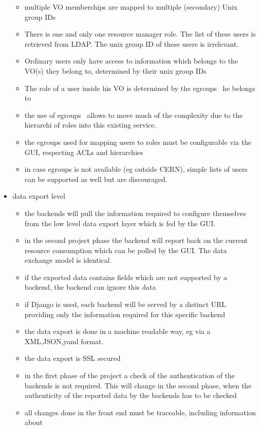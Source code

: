 \begin{itemize}
\begin{itemize}
\item multiple VO memberships are mapped to multiple (secondary) Unix group IDs 
\item There is one and only one resource manager role. The list of these users is retrieved from LDAP. The unix group ID of these users is irrelevant.
\item Ordinary users only have access to information which belongs to the VO(s) they belong to, determined by their unix group IDs
\item The role of a user inside his VO is determined by the egroups~\cite{CernEgroups} he belongs to
\item the use of egroups~\cite{CernEgroups} allows to move much of the complexity due to the hierarchi of roles into this existing service.
\item the egroups used for mapping users to roles must be configurable via the GUI, respecting ACLs and hierarchies
\item in case egroups is not available (eg outside CERN), simple lists of users can be supported as well but are discouraged.  
\end{itemize}
\item data export level
\begin{itemize}
\item the backends will pull the information required to configure themselves from the low level data export layer which is fed by the GUI. 
\item in the second project phase the backend will report back on the  current resource consumption which can be polled by the GUI. The data exchange model is identical.
\item if the exported data contains fields which are not supported by a backend, the backend can ignore this data
\item if Django is used, each backend will be served by a distinct URL providing only the information required for this specific backend
\item the data export is done in a machine readable way, eg via a XML,JSON,yaml format. 
\item the data export is SSL secured 
\item in the first phase of the project a check of the authentication of the backends is not required. This will change in the second phase, when the authenticity of the reported data by the backends has to be checked
\item all changes done in the front end must be traceable, including information about 

\end{itemize}
\end{itemize}
